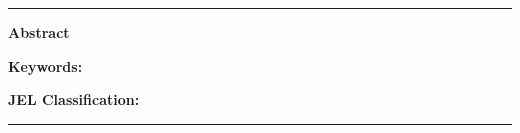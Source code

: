 \vspace*{1cm}

\noindent\rule{\textwidth}{0.4pt}
\vspace{0.3cm}

\noindent\textbf{Abstract}

\vspace{0.15cm}

\noindent\WPabstract

\vspace{0.4cm}

\noindent\textbf{Keywords:} \WPkeywords

\vspace{0.15cm}

\noindent\textbf{JEL Classification:} \WPjel

\vspace{0.3cm}
\noindent\rule{\textwidth}{0.4pt}

\newpage
